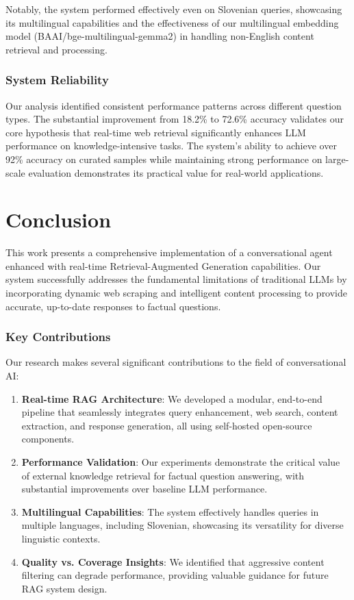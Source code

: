 \documentclass[fleqn,moreauthors,10pt]{ds_report}
\begin{document}
Notably, the system performed effectively even on Slovenian queries, showcasing its multilingual capabilities and the effectiveness of our multilingual embedding model (BAAI/bge-multilingual-gemma2) in handling non-English content retrieval and processing.

\subsubsection*{System Reliability}
Our analysis identified consistent performance patterns across different question types. The substantial improvement from 18.2\% to 72.6\% accuracy validates our core hypothesis that real-time web retrieval significantly enhances LLM performance on knowledge-intensive tasks. The system's ability to achieve over 92\% accuracy on curated samples while maintaining strong performance on large-scale evaluation demonstrates its practical value for real-world applications.

\section*{Conclusion}

This work presents a comprehensive implementation of a conversational agent enhanced with real-time Retrieval-Augmented Generation capabilities. Our system successfully addresses the fundamental limitations of traditional LLMs by incorporating dynamic web scraping and intelligent content processing to provide accurate, up-to-date responses to factual questions.

\subsubsection*{Key Contributions}
Our research makes several significant contributions to the field of conversational AI:

\begin{enumerate}[noitemsep]
    \item \textbf{Real-time RAG Architecture}: We developed a modular, end-to-end pipeline that seamlessly integrates query enhancement, web search, content extraction, and response generation, all using self-hosted open-source components.
    
    \item \textbf{Performance Validation}: Our experiments demonstrate the critical value of external knowledge retrieval for factual question answering, with substantial improvements over baseline LLM performance.
    
    \item \textbf{Multilingual Capabilities}: The system effectively handles queries in multiple languages, including Slovenian, showcasing its versatility for diverse linguistic contexts.
    
    \item \textbf{Quality vs. Coverage Insights}: We identified that aggressive content filtering can degrade performance, providing valuable guidance for future RAG system design.
\end{enumerate}
\end{document}
